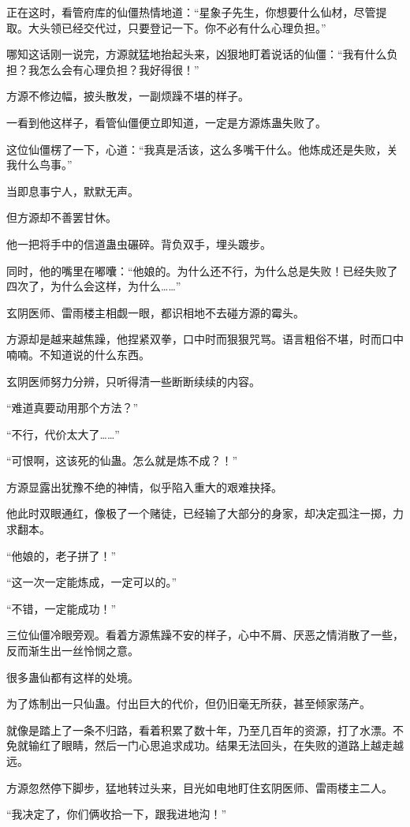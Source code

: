 \begin{this_body}
正在这时，看管府库的仙僵热情地道：“星象子先生，你想要什么仙材，尽管提取。大头领已经交代过，只要登记一下。你不必有什么心理负担。”

哪知这话刚一说完，方源就猛地抬起头来，凶狠地盯着说话的仙僵：“我有什么负担？我怎么会有心理负担？我好得很！”

方源不修边幅，披头散发，一副烦躁不堪的样子。

一看到他这样子，看管仙僵便立即知道，一定是方源炼蛊失败了。

这位仙僵楞了一下，心道：“我真是活该，这么多嘴干什么。他炼成还是失败，关我什么鸟事。”

当即息事宁人，默默无声。

但方源却不善罢甘休。

他一把将手中的信道蛊虫碾碎。背负双手，埋头踱步。

同时，他的嘴里在嘟囔：“他娘的。为什么还不行，为什么总是失败！已经失败了四次了，为什么会这样，为什么……”

玄阴医师、雷雨楼主相觑一眼，都识相地不去碰方源的霉头。

方源却是越来越焦躁，他捏紧双拳，口中时而狠狠咒骂。语言粗俗不堪，时而口中喃喃。不知道说的什么东西。

玄阴医师努力分辨，只听得清一些断断续续的内容。

“难道真要动用那个方法？”

“不行，代价太大了……”

“可恨啊，这该死的仙蛊。怎么就是炼不成？！”

方源显露出犹豫不绝的神情，似乎陷入重大的艰难抉择。

他此时双眼通红，像极了一个赌徒，已经输了大部分的身家，却决定孤注一掷，力求翻本。

“他娘的，老子拼了！”

“这一次一定能炼成，一定可以的。”

“不错，一定能成功！”

三位仙僵冷眼旁观。看着方源焦躁不安的样子，心中不屑、厌恶之情消散了一些，反而渐生出一丝怜悯之意。

很多蛊仙都有这样的处境。

为了炼制出一只仙蛊。付出巨大的代价，但仍旧毫无所获，甚至倾家荡产。

就像是踏上了一条不归路，看着积累了数十年，乃至几百年的资源，打了水漂。不免就输红了眼睛，然后一门心思追求成功。结果无法回头，在失败的道路上越走越远。

方源忽然停下脚步，猛地转过头来，目光如电地盯住玄阴医师、雷雨楼主二人。

“我决定了，你们俩收拾一下，跟我进地沟！”


\end{this_body}
